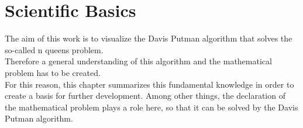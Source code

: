 

\chapter{Scientific Basics}
The aim of this work is to visualize the Davis Putman algorithm that solves the so-called n queens problem. 
\\
Therefore a general understanding of this algorithm and the mathematical problem has to be created.
\\
For this reason, this chapter summarizes this fundamental knowledge in order to create a basis for further development. Among other things, the declaration of the mathematical problem plays a role here, so that it can be solved by the Davis Putman algorithm. 

